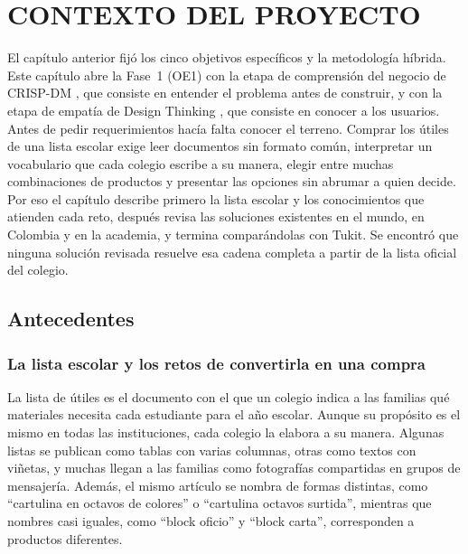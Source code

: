 \setcounter{subsection}{0}
\section{CONTEXTO DEL PROYECTO}

El capítulo anterior fijó los cinco objetivos específicos y la metodología híbrida. Este capítulo abre
la Fase~1 (OE1) con la etapa de comprensión del negocio de CRISP-DM \citep{chapman_crisp-dm_2000}, que
consiste en entender el problema antes de construir, y con la etapa de empatía de Design Thinking
\citep{brown_design_2008}, que consiste en conocer a los usuarios. Antes de pedir requerimientos hacía
falta conocer el terreno. Comprar los útiles de una lista escolar exige leer documentos sin formato común,
interpretar un vocabulario que cada colegio escribe a su manera, elegir entre muchas combinaciones de
productos y presentar las opciones sin abrumar a quien decide. Por eso el capítulo describe primero la
lista escolar y los conocimientos que atienden cada reto, después revisa las soluciones existentes en el
mundo, en Colombia y en la academia, y termina comparándolas con Tukit. Se encontró que ninguna solución
revisada resuelve esa cadena completa a partir de la lista oficial del colegio.\par

\subsection{Antecedentes}

\subsubsection{La lista escolar y los retos de convertirla en una compra}

La lista de útiles es el documento con el que un colegio indica a las familias qué
materiales necesita cada estudiante para el año escolar. Aunque su propósito es el mismo en
todas las instituciones, cada colegio la elabora a su manera. Algunas listas se publican
como tablas con varias columnas, otras como textos con viñetas, y muchas llegan a las
familias como fotografías compartidas en grupos de mensajería. Además, el mismo artículo se
nombra de formas distintas, como ``cartulina en octavos de colores'' o ``cartulina octavos
surtida'', mientras que nombres casi iguales, como ``block oficio'' y ``block carta'',
corresponden a productos diferentes.\par

